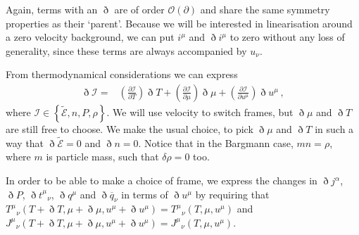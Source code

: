 \documentclass[superscriptaddress,prd,nofootinbib,preprintnumbers,longbibliography,11pt,eqsecnum]{revtex4-1}
\begin{document}
\begin{appendix}
Again, terms with an $\eth$ are of order $\mathcal{O}(\partial)$ and share the same symmetry properties as their `parent'. Because we will be interested in linearisation around a zero velocity background, we can put $i^{\mu}$ and $\eth i^{\mu}$ to zero without any loss of generality, since these terms are always accompanied by $u_{\nu}$.

From thermodynamical considerations we can express
\begin{equation}\begin{aligned}
	\eth
	\mathcal{I}
	=&
	\left(
		\frac{\partial \mathcal{I}
		}{
		\partial T}
	\right)
	\eth T
	+
	\left(
		\frac{\partial \mathcal{I}
		}{
		\partial \mu}
	\right)
	\eth \mu
	+
	\left(
		\frac{\partial \mathcal{I}
		}{
		\partial u^{\mu}}
	\right)
	\eth u^{\mu}
	\,,
\end{aligned}\end{equation}
where $\mathcal{I}\in\left\{\tilde{\mathcal{E}},n,P,\rho\right\}$.
We will use velocity to switch frames, but $\eth\mu$ and $\eth T$ are still free to choose. We make the usual choice, to pick $\eth \mu$ and $\eth T$ in such a way that $\eth \tilde{\mathcal{E}}=0$ and $\eth n=0$. Notice that in the Bargmann case, $m n=\rho$, where $m$ is particle mass, such that $\delta\rho=0$ too. 

In order to be able to make a choice of frame, we express the changes in $\eth j^{\alpha}$, $\eth P$, $\eth t^{\mu}_{\;\;\,\nu}$, $\eth q^{\mu}$ and $\eth \overline{q}_{\nu}$ in terms of $\eth u^{\mu}$ by requiring that $T^{\mu}_{\;\;\,\nu}(T+\eth T,\mu+\eth\mu,u^{\mu}+\eth u^{\mu})=T^{\mu}_{\;\;\,\nu}(T,\mu,u^{\mu})$ and $J^{\mu}_{\;\;\,\nu}(T+\eth T,\mu+\eth\mu,u^{\mu}+\eth u^{\mu})=J^{\mu}_{\;\;\,\nu}(T,\mu,u^{\mu})$. 


\end{appendix}
\end{document}

